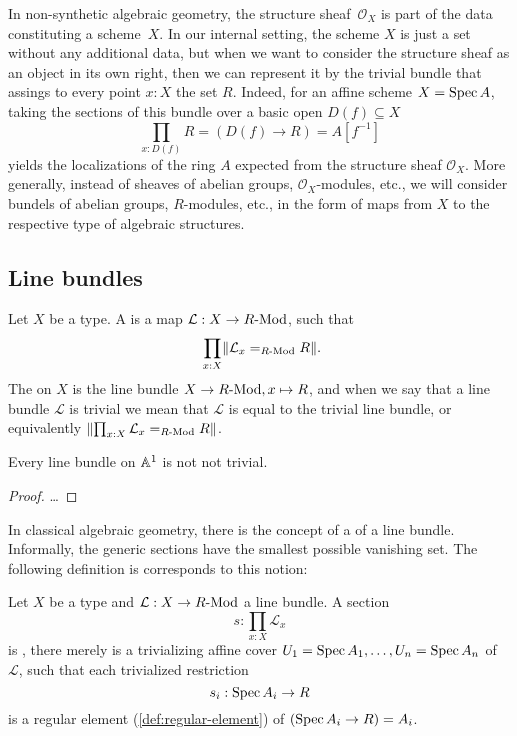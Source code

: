 In non-synthetic algebraic geometry,
the structure sheaf~$\mathcal{O}_X$ is part of the data constituting a scheme~$X$.
In our internal setting,
the scheme $X$ is just a set without any additional data,
but when we want to consider the structure sheaf as an object in its own right,
then we can represent it by the trivial bundle
that assings to every point $x : X$ the set $R$.
Indeed, for an affine scheme $X = \operatorname{Spec} A$,
taking the sections of this bundle over a basic open $D(f) \subseteq X$
\[ \prod_{x : D(f)} R = (D(f) \to R) = A[f^{-1}] \]
yields the localizations of the ring $A$
expected from the structure sheaf $\mathcal{O}_X$.
More generally,
instead of sheaves of abelian groups, $\mathcal{O}_X$-modules, etc.,
we will consider bundels of abelian groups, $R$-modules, etc.,
in the form of maps from $X$ to the respective type of algebraic structures.

\subsection{Line bundles}

\begin{definition}%
  Let $X$ be a type.
  A  is a map $\mathcal L : X\to R\text{-}\mathrm{Mod}$,
  such that
  \[ \prod_{x:X} \propTrunc{\mathcal L_x=_{\Mod{R}}R} \rlap{.}\]
  The  on $X$ is the line bundle
  $X \to R\text{-}\mathrm{Mod}, x \mapsto R$,
  and when we say that a line bundle $\mathcal{L}$ is trivial
  we mean that $\mathcal{L}$ is equal to the trivial line bundle,
  or equivalently $\lVert \prod_{x:X} \mathcal L_x=_{R\text{-}\mathrm{Mod}}R \rVert$.
\end{definition}

\begin{theorem}
  Every line bundle on $\mathbb{A}^1$ is not not trivial.
\end{theorem}

\begin{proof}
  \dots
\end{proof}

In classical algebraic geometry,
there is the concept of a  of a line bundle.
Informally, the generic sections have the smallest possible vanishing set.
The following definition is corresponds to this notion:

\begin{definition}%
  \label{def:regular-section}
  Let $X$ be a type and $\mathcal L:X\to R\text{-}\mathrm{Mod}$ a line bundle.
  A section
  \[ s:\prod_{x:X}\mathcal L_x \]
  is , there merely is a trivializing affine cover $U_1=\operatorname{Spec} A_1,\dots,U_n=\operatorname{Spec} A_n$
  of $\mathcal L$, such that each trivialized restriction
  \[ s_i:\operatorname{Spec} A_i\to R \]
  is a regular element (\cref{def:regular-element}) of $(\operatorname{Spec} A_i\to R) = A_i$.
\end{definition}

